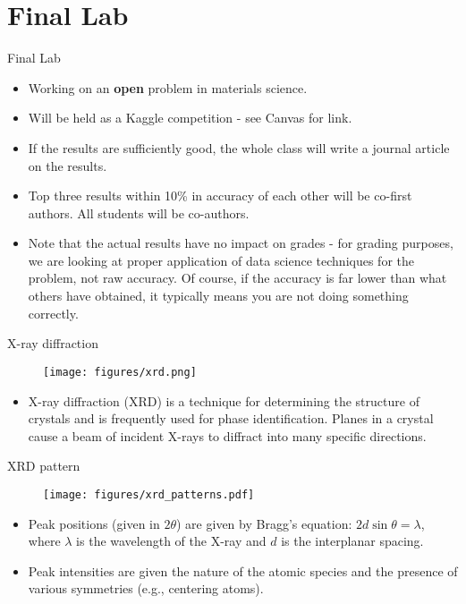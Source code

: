 \documentclass[aspectratio=169]{beamer}
\begin{document}
\section{Final Lab}

\begin{frame}{Final Lab}
    \begin{itemize}
        \item Working on an \textbf{open} problem in materials science.
        \item Will be held as a Kaggle competition - see Canvas for link.
        \item If the results are sufficiently good, the whole class will write a journal article on the results.
        \item Top three results within 10\% in accuracy of each other will be co-first authors. All students will be co-authors.
        \item Note that the actual results have no impact on grades - for grading purposes, we are looking at proper application of data science techniques for the problem, not raw accuracy. Of course, if the accuracy is far lower than what others have obtained, it typically means you are not doing something correctly.
    \end{itemize}
\end{frame}


 \begin{frame}{X-ray diffraction}
 \begin{figure}
     \centering
     \texttt{[image: figures/xrd.png]}
 \end{figure}
    \begin{itemize}
        \item X-ray diffraction (XRD) is a technique for determining the structure of crystals and is frequently used for phase identification. Planes in a crystal cause a beam of incident X-rays to diffract into many specific directions.
    \end{itemize}
\end{frame}


\begin{frame}{XRD pattern}
\begin{figure}
    \centering
    \texttt{[image: figures/xrd\_patterns.pdf]}
\end{figure}
\begin{itemize}
    \item Peak positions (given in $2\theta$) are given by Bragg's equation: $2d \sin{\theta} = \lambda$, where $\lambda$ is the wavelength of the X-ray and $d$ is the interplanar spacing.
    \item Peak intensities are given the nature of the atomic species and the presence of various symmetries (e.g., centering atoms).
\end{itemize}
\end{frame}
\end{document}
